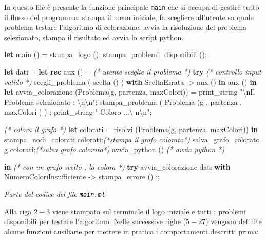 \documentclass[11pt]{article}
\newenvironment{Shaded}{}{}
\newcommand{\KeywordTok}[1]{\textcolor[rgb]{0.00,0.44,0.13}{\textbf{{#1}}}}
\newcommand{\DataTypeTok}[1]{\textcolor[rgb]{0.56,0.13,0.00}{{#1}}}
\newcommand{\CharTok}[1]{\textcolor[rgb]{0.25,0.44,0.63}{{#1}}}
\newcommand{\StringTok}[1]{\textcolor[rgb]{0.25,0.44,0.63}{{#1}}}
\newcommand{\CommentTok}[1]{\textcolor[rgb]{0.38,0.63,0.69}{\textit{{#1}}}}
\newcommand{\NormalTok}[1]{{#1}}
\begin{document}
    In questo file è presente la funzione principale \texttt{main} che si
occupa di gestire tutto il flusso del programma: stampa il menu
iniziale, fa scegliere all'utente su quale problema testare l'algoritmo
di colorazione, avvia la risoluzione del problema selezionato, stampa il
risultato ed avvia lo script python.

    \begin{Shaded}
\begin{Highlighting}[]
\KeywordTok{let}\NormalTok{ main () =}
\NormalTok{    stampa\_logo ();}
\NormalTok{    stampa\_problemi\_disponibili ();}

    \KeywordTok{let}\NormalTok{ dati =}
        \KeywordTok{let} \KeywordTok{rec}\NormalTok{ aux () = }\CommentTok{(* utente sceglie il problema *)}
            \KeywordTok{try} \CommentTok{(* controllo input valido *)}
\NormalTok{                scegli\_problema ( scelta () )}
            \KeywordTok{with}\NormalTok{ SceltaErrata {-}\textgreater{}}
\NormalTok{                aux ()}
        \KeywordTok{in}\NormalTok{ aux ()}
  \KeywordTok{in} \KeywordTok{let}\NormalTok{ avvia\_colorazione (Problema(g, partenza, maxColori)) =}
    \DataTypeTok{print\_string} \StringTok{"}\CharTok{\textbackslash{}n}\StringTok{Il Problema selezionato : }\CharTok{\textbackslash{}n\textbackslash{}n}\StringTok{"}\NormalTok{;}
\NormalTok{    stampa\_problema ( Problema (g , partenza , maxColori ) ) ;}
    \DataTypeTok{print\_string} \StringTok{" Coloro ...\textbackslash{} n}\CharTok{\textbackslash{}n}\StringTok{"}\NormalTok{;}

    \CommentTok{(* colora il grafo *)}
    \KeywordTok{let}\NormalTok{ colorati = risolvi (Problema(g, partenza, maxColori)) }\KeywordTok{in}
\NormalTok{        stampa\_nodi\_colorati colorati;}\CommentTok{(*stampa il grafo colorato*)}
\NormalTok{        salva\_grafo\_colorato g colorati;}\CommentTok{(*salva grafo colorato*)}
\NormalTok{        avvia\_python () }\CommentTok{(* avvia python *)}

    \KeywordTok{in} \CommentTok{(* con un grafo scelto , lo colora *)}
        \KeywordTok{try}
\NormalTok{            avvia\_colorazione dati}
        \KeywordTok{with}\NormalTok{ NumeroColoriInsufficiente {-}\textgreater{}}
\NormalTok{            stampa\_errore ()}
\NormalTok{;;}
\end{Highlighting}
\end{Shaded}

\emph{Parte del codice del file \texttt{main.ml}}

    Alla riga \(2 - 3\) viene stampato sul terminale il logo iniziale e
tutti i problemi disponibili per testare l'algoritmo. Nelle successive
righe (\(5 - 27\)) vengono definite alcune funzioni ausiliarie per
mettere in pratica i comportamenti descritti prima:
\end{document}
